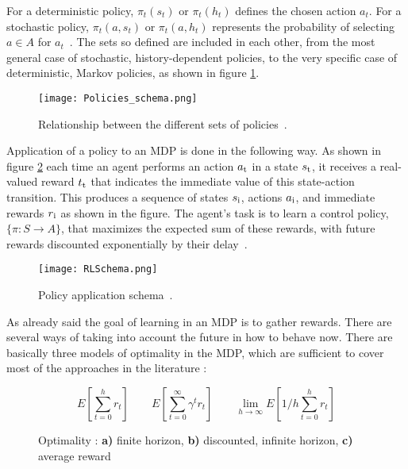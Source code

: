 For a deterministic policy, $\pi_t (s_t)$ or $\pi_t (h_t)$ defines the chosen action $a_t$. For a stochastic policy, $\pi_t (a, s_t)$ or $\pi_t (a, h_t)$ represents the probability of selecting $a \in A$ for $a_t$~\cite{Sigaud:2010:MDP:1841781}. The sets so defined are included in each other, from the most general case of stochastic, history-dependent policies, to the very specific case of deterministic, Markov policies, as shown in figure \ref{fig:Policies_schema}.

\begin{figure}[h!]
	\centering
	\texttt{[image: Policies\_schema.png]}
	\caption{Relationship between the different sets of policies~\cite{Sigaud:2010:MDP:1841781}.}
	\label{fig:Policies_schema}
\end{figure}

Application of a policy to an MDP is done in the following way. As shown in figure \ref{fig:Policy_application_schema} each time an agent performs an action $a\textsubscript{t}$ in a state $s\textsubscript{t}$, it receives a real-valued reward $t\textsubscript{t}$ that indicates the immediate value of this state-action transition. This produces a sequence of states $s\textsubscript{i}$, actions $a\textsubscript{i}$, and immediate rewards $r\textsubscript{i}$ as shown in the figure. The agent's task is to learn a control policy, $\{\pi : S \longrightarrow A\}$, that maximizes the expected sum of these rewards, with future rewards discounted exponentially by their delay~\cite{Mitchell}.

\begin{figure}[h!]
	\centering
	\texttt{[image: RLSchema.png]}
	\caption{Policy application schema~\cite{SuttonBarto}.}
	\label{fig:Policy_application_schema}
\end{figure}

As already said the goal of learning in an MDP is to gather rewards. There are several ways of taking into account the future in how to behave now. There are basically three models of optimality in the MDP, which are sufficient to cover most of the approaches in the literature :

\begin{figure}[h!]
\begin{equation*}
E[\sum_{t = 0}^h r_t]
\qquad
E[\sum_{t = 0}^\infty \gamma^t r_t]
\qquad
\lim\limits_{h \rightarrow \infty} E[1/h \sum_{t = 0}^h r_t]
\end{equation*}
\caption{Optimality : \textbf{a)} finite horizon, \textbf{b)} discounted, infinite horizon, \textbf{c)} average reward}
\end{figure}

